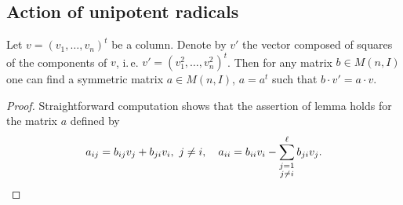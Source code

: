\subsection{Action of unipotent radicals}\label{sec:ur-action}
\begin{lemma}\label{lemma:PSV-symplectic-trick}
 Let $v=(v_1,\ldots, v_n)^t$ be a column. Denote by $v'$ the vector composed of squares of the components of $v$, i.\,e. $v'=(v_1^2, \ldots, v_n^2)^t$.
 Then for any matrix $b \in M(n, I)$ one can find a symmetric matrix $a \in M(n, I)$, $a=a^t$ such that $b \cdot v' = a \cdot v$. \end{lemma}
\begin{proof}
Straightforward computation shows that the assertion of lemma holds for the matrix $a$ defined by
\begin{equation*}
a_{ij} = b_{ij} v_{j} + b_{ji} v_{i},\ j\neq i,\quad a_{ii} = b_{ii} v_{i} - \sum\limits_{\mathclap{\substack{j=1 \\ j\neq i}}}^\ell b_{ji} v_{j}. \qedhere
\end{equation*}
\end{proof}

